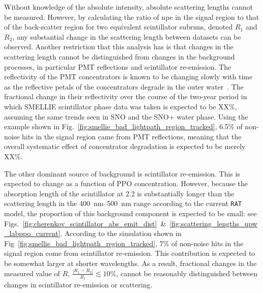 Without knowledge of the absolute intensity, absolute scattering lengths cannot be measured. However, by calculating the ratio of npe in the signal region to that of the back-scatter region for two equivalent scintillator subruns, denoted $R_{1}$ and $R_{2}$, any substantial change in the scattering length between datasets can be observed. Another restriction that this analysis has is that changes in the scattering length cannot be distinguished from changes in the background processes, in particular PMT reflections and scintillator re-emission. The reflectivity of the PMT concentrators is known to be changing slowly with time as the reflective petals of the concentrators degrade in the outer water~\cite{andersonOpticalCalibrationSNO2021}. %
The fractional change in their reflectivity over the course of the two-year period in which SMELLIE scintillator phase data was taken is expected to be XX\%, %
assuming the same trends seen in SNO and the SNO+ water phase. Using the example shown in Fig.~\ref{fig:smellie_bad_lightpath_region_tracked}, 6.5\% of non-noise hits in the signal region came from PMT reflections, meaning that the overall systematic effect of concentrator degradation is expected to be merely XX\%. %
 
The other dominant source of background is scintillator re-emission. This is expected to change as a function of PPO concentration. However, because the absorption length of the scintillator at \SI{2.2}{\gpl} is substantially longer than the scattering length in the \SIrange{400}{500}{\nm} range according to the current \texttt{RAT} model, the proportion of this background component is expected to be small: see Figs.~\ref{fig:cherenkov_scintillator_abs_emit_dist}~\&~\ref{fig:scattering_lengths_upw_labppo_current}. According to the simulation shown in Fig~\ref{fig:smellie_bad_lightpath_region_tracked}, 7\% of non-noise hits in the signal region come from scintillator re-emission. This contribution is expected to be somewhat larger at shorter wavelengths. As a result, fractional changes in the measured value of $R$, $\frac{\left|R_{1}-R_{2}\right|}{R_{1}}\lesssim 10\%$, cannot be reasonably distinguished between changes in scintillator re-emission or scattering.

